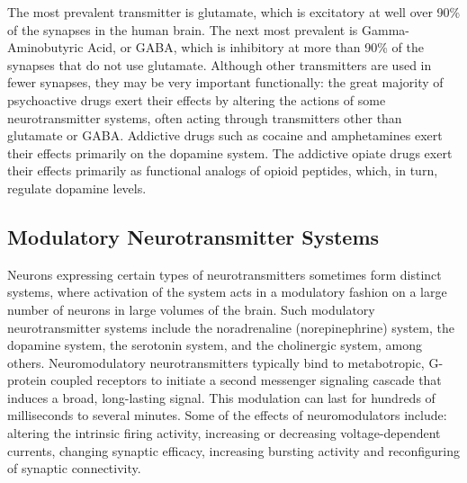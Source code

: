 \documentclass[]{book}
\begin{document}
The most prevalent transmitter is glutamate, which is excitatory at well over 90\% of the synapses in the human brain. The next most prevalent is Gamma-Aminobutyric Acid, or GABA, which is inhibitory at more than 90\% of the synapses that do not use glutamate. Although other transmitters are used in fewer synapses, they may be very important functionally: the great majority of psychoactive drugs exert their effects by altering the actions of some neurotransmitter systems, often acting through transmitters other than glutamate or GABA. Addictive drugs such as cocaine and amphetamines exert their effects primarily on the dopamine system. The addictive opiate drugs exert their effects primarily as functional analogs of opioid peptides, which, in turn, regulate dopamine levels.

\hypertarget{modulatory-neurotransmitter-systems}{%
\subsection{Modulatory Neurotransmitter Systems}\label{modulatory-neurotransmitter-systems}}

Neurons expressing certain types of neurotransmitters sometimes form distinct systems, where activation of the system acts in a modulatory fashion on a large number of neurons in large volumes of the brain. Such modulatory neurotransmitter systems include the noradrenaline (norepinephrine) system, the dopamine system, the serotonin system, and the cholinergic system, among others. Neuromodulatory neurotransmitters typically bind to metabotropic, G-protein coupled receptors to initiate a second messenger signaling cascade that induces a broad, long-lasting signal. This modulation can last for hundreds of milliseconds to several minutes. Some of the effects of neuromodulators include: altering the intrinsic firing activity, increasing or decreasing voltage-dependent currents, changing synaptic efficacy, increasing bursting activity and reconfiguring of synaptic connectivity.
\end{document}

